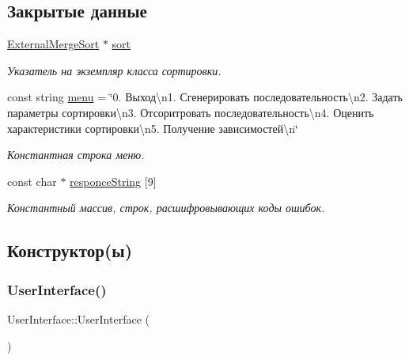 \subsection*{Закрытые данные}
\begin{DoxyCompactItemize}
\item 
\hyperlink{class_external_merge_sort}{External\+Merge\+Sort} $\ast$ \hyperlink{class_user_interface_af3405ffdb7e2834c2cf63662b5415a91}{sort}
\begin{DoxyCompactList}\small\item\em Указатель на экземпляр класса сортировки. \end{DoxyCompactList}\item 
const string \hyperlink{class_user_interface_a24b9a8a0a253382b0737a86f7ecf7d8b}{menu} = \char`\"{}0. Выход\textbackslash{}n1. Сгенерировать последовательность\textbackslash{}n2. Задать параметры сортировки\textbackslash{}n3. Отсоритровать последовательность\textbackslash{}n4. Оценить характеристики сортировки\textbackslash{}n5. Получение зависимостей\textbackslash{}n\char`\"{}
\begin{DoxyCompactList}\small\item\em Константная строка меню. \end{DoxyCompactList}\item 
const char $\ast$ \hyperlink{class_user_interface_a3ec4a2871150fd6b83ddf9d459aa0afc}{responce\+String} \mbox{[}9\mbox{]}
\begin{DoxyCompactList}\small\item\em Константный массив, строк, расшифровывающих коды ошибок. \end{DoxyCompactList}\end{DoxyCompactItemize}


\subsection{Конструктор(ы)}
\hypertarget{class_user_interface_ae6fb70370701b3bd6120e923df9705b0}{}\label{class_user_interface_ae6fb70370701b3bd6120e923df9705b0} 
\subsubsection{\texorpdfstring{User\+Interface()}{UserInterface()}}
{\footnotesize\ttfamily User\+Interface\+::\+User\+Interface (\begin{DoxyParamCaption}{ }\end{DoxyParamCaption})}



